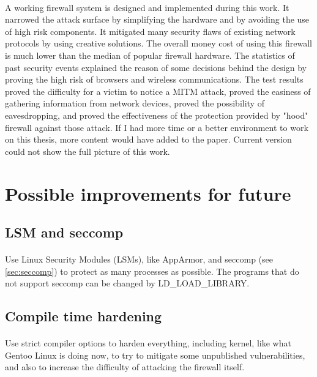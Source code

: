 \documentclass[mscthesis]{usiinfthesis}
\begin{document}
\paragraph{}
A working firewall system is designed and implemented during this work. It narrowed the attack surface by simplifying the hardware and by avoiding the use of high risk components. It mitigated many security flaws of existing network protocols by using creative solutions. The overall money cost of using this firewall is much lower than the median of popular firewall hardware. The statistics of past security events explained the reason of some decisions behind the design by proving the high risk of browsers and wireless communications. The test results proved the difficulty for a victim to notice a MITM attack, proved the easiness of gathering information from network devices, proved the possibility of eavesdropping, and proved the effectiveness of the protection provided by "hood" firewall against those attack. If I had more time or a better environment to work on this thesis, more content would have added to the paper. Current version could not show the full picture of this work.

\section{Possible improvements for future}
\subsection{LSM and seccomp}
\paragraph{}
Use Linux Security Modules (LSMs), like AppArmor, and seccomp (see \cref{sec:seccomp}) to protect as many processes as possible. The programs that do not support seccomp can be changed by LD\_LOAD\_LIBRARY.

\subsection{Compile time hardening}
\paragraph{}
Use strict compiler options to harden everything, including kernel, like what Gentoo Linux is doing now, to try to mitigate some unpublished vulnerabilities, and also to increase the difficulty of attacking the firewall itself.
\end{document}
